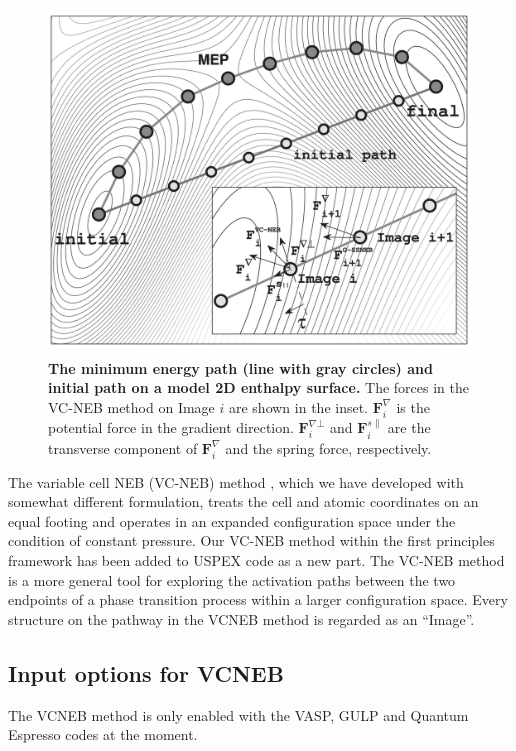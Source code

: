 \documentclass[12pt]{article}
\begin{document}
\begin{figure}[htbp] \centering
\includegraphics[scale=0.95]{pic/VCNEB}
\caption{\footnotesize \textbf{The minimum energy path (line with gray circles)
and initial path on a model 2D enthalpy surface.} {The forces in the VC-NEB
method on Image $i$ are shown in the inset. $\mathbf{F}^{\nabla}_{i}$ is the
potential force in the gradient direction. $\mathbf{F}^{\nabla\bot}_{i}$ and
$\mathbf{F}^{s\parallel}_{i}$ are the transverse component of
$\mathbf{F}^{\nabla}_{i}$ and the spring force, respectively.}}
\label{fig:VCNEB}
\end{figure}

The variable cell NEB (VC-NEB) method \cite{Qian2013}, which we have developed
with somewhat different formulation, treats the cell and atomic coordinates on
an equal footing and operates in an expanded configuration space under the
condition of constant pressure. Our VC-NEB method within the first principles
framework has been added to USPEX code as a new part. The VC-NEB method is a
more general tool for exploring the activation paths between the two endpoints
of a phase transition process within a larger configuration space. Every
structure on the pathway in the VCNEB method is regarded as an ``Image''.


\subsection{Input options for VCNEB}

The VCNEB method is only enabled with the VASP, GULP and Quantum Espresso codes
at the moment.
\end{document}
